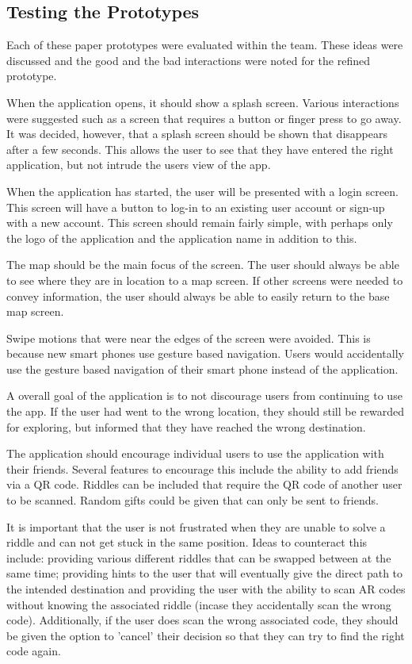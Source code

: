 \documentclass[10pt,twocolumn]{article} %
\begin{document}
\subsection*{Testing the Prototypes}
Each of these paper prototypes were evaluated within the team. These ideas were discussed and the good and the bad interactions were noted for the refined prototype.

When the application opens, it should show a splash screen. Various interactions were suggested such as a screen that requires a button or finger press to go away. It was decided, however, that a splash screen should be shown that disappears after a few seconds. This allows the user to see that they have entered the right application, but not intrude the users view of the app.

When the application has started, the user will be presented with a login screen. This screen will have a button to log-in to an existing user account or sign-up with a new account. This screen should remain fairly simple, with perhaps only the logo of the application and the application name in addition to this.

The map should be the main focus of the screen. The user should always be able to see where they are in location to a map screen. If other screens were needed to convey information, the user should always be able to easily return to the base map screen.

Swipe motions that were near the edges of the screen were avoided. This is because new smart phones use gesture based navigation. Users would accidentally use the gesture based navigation of their smart phone instead of the application.

A overall goal of the application is to not discourage users from continuing to use the app. If the user had went to the wrong location, they should still be rewarded for exploring, but informed that they have reached the wrong destination.

The application should encourage individual users to use the application with their friends. Several features to encourage this include the ability to add friends via a QR code. Riddles can be included that require the QR code of another user to be scanned. Random gifts could be given that can only be sent to friends.

It is important that the user is not frustrated when they are unable to solve a riddle and can not get stuck in the same position. Ideas to counteract this include: providing various different riddles that can be swapped between at the same time; providing hints to the user that will eventually give the direct path to the intended destination and providing the user with the ability to scan AR codes without knowing the associated riddle (incase they accidentally scan the wrong code). Additionally, if the user does scan the wrong associated code, they should be given the option to 'cancel' their decision so that they can try to find the right code again.
\end{document}

